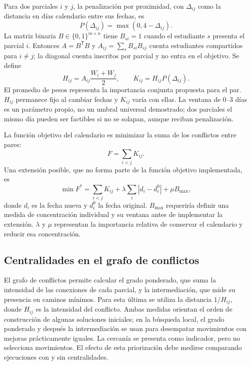 \documentclass[conference]{IEEEtran}
\begin{document}
Para dos parciales $i$ y $j$, la penalización por proximidad, con $\Delta_{ij}$ como la distancia en días calendario entre sus fechas, es
\begin{equation}
  P(\Delta_{ij}) = \max(0,4-\Delta_{ij}).
\end{equation}
La matriz binaria $B\in\{0,1\}^{m\times n}$ tiene $B_{si}=1$ cuando el estudiante $s$ presenta el parcial $i$. Entonces $A=B^{\mathsf T}B$ y $A_{ij}=\sum_s B_{si}B_{sj}$ cuenta estudiantes compartidos para $i\ne j$; la diagonal cuenta inscritos por parcial y no entra en el objetivo. Se define
\begin{equation}
 H_{ij}=A_{ij}\frac{W_i+W_j}{2},\qquad K_{ij}=H_{ij}P(\Delta_{ij}).
\end{equation}
El promedio de pesos representa la importancia conjunta propuesta para el par. $H_{ij}$ permanece fijo al cambiar fechas y $K_{ij}$ varía con ellas. La ventana de 0--3 días es un parámetro propio, no un umbral universal demostrado; dos parciales el mismo día pueden ser factibles si no se solapan, aunque reciban penalización.

La función objetivo del calendario es minimizar la suma de los conflictos entre pares:
\begin{equation}
  F = \sum_{i<j} K_{ij}.
\end{equation}
Una extensión posible, que no forma parte de la función objetivo implementada, es
\begin{equation}
  \min F^* = \sum_{i<j}K_{ij} + \lambda\sum_i|d_i-d_i^0| + \mu B_{\max},
\end{equation}
donde $d_i$ es la fecha nueva y $d_i^0$ la fecha original. $B_{\max}$ requeriría definir una medida de concentración individual y su ventana antes de implementar la extensión. $\lambda$ y $\mu$ representan la importancia relativa de conservar el calendario y reducir esa concentración.

\subsection{Centralidades en el grafo de conflictos}
El grafo de conflictos permite calcular el grado ponderado, que suma la intensidad de las conexiones de cada parcial, y la intermediación, que mide su presencia en caminos mínimos. Para esta última se utiliza la distancia $1/H_{ij}$, donde $H_{ij}$ es la intensidad del conflicto. Ambas medidas orientan el orden de construcción de algunas soluciones iniciales; en la búsqueda local, el grado ponderado y después la intermediación se usan para desempatar movimientos con mejoras prácticamente iguales. La cercanía se presenta como indicador, pero no selecciona movimientos. El efecto de esta priorización debe medirse comparando ejecuciones con y sin centralidades.
\end{document}
